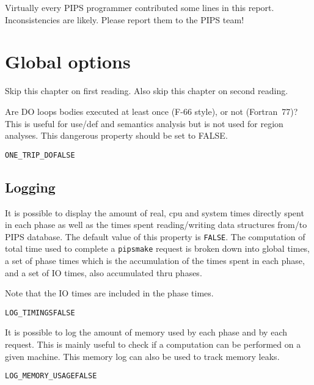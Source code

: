 \documentclass[a4paper]{report}
\newenvironment{PipsProp}{\begin{alltt}}{\end{alltt}}
\begin{document}
Virtually every PIPS programmer contributed some lines in this
report. Inconsistencies are likely. Please report them to the PIPS team!

\tableofcontents



\chapter{Global options}

Skip this chapter on first reading.
Also skip this chapter on second reading.


Are DO loops bodies executed at least once (F-66 style), or not (Fortran~77)?
This is useful for use/def and semantics analysis but is not used for
region analyses. This dangerous property should be set to FALSE.

\begin{PipsProp}
ONE_TRIP_DO FALSE
\end{PipsProp}

\section{Logging}

It is possible to display the amount of real, cpu and system times
directly spent in each phase as well as the times spent reading/writing data
structures from/to PIPS database. The default value of this property is
\verb+FALSE+. The computation of total time used to complete a
\verb+pipsmake+ request is broken down into global times, a set of phase times
which is the accumulation of the times spent in each phase, and a set of
IO times, also accumulated thru phases.

Note that the IO times are included in the phase times.

\begin{PipsProp}
LOG_TIMINGS FALSE
\end{PipsProp}

It is possible to log the amount of memory used by each phase and by
each request. This is mainly useful to check if a computation can be
performed on a given machine. This memory log can also be used to track memory
leaks.

\begin{PipsProp}
LOG_MEMORY_USAGE FALSE
\end{PipsProp}
\end{document}
